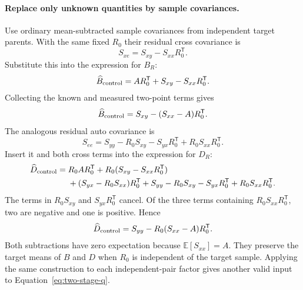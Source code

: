 \documentclass[11pt]{article}
\newcommand{\E}{\mathbb{E}}
\begin{document}
\paragraph{Replace only unknown quantities by sample covariances.}
Use ordinary mean-subtracted sample covariances from independent target
parents. With the same fixed $R_0$ their residual cross covariance is
\begin{equation}
 S_{xe}=S_{xy}-S_{xx}R_0^{\mathsf T}.
\end{equation}
Substitute this into the expression for $B_R$:
\begin{equation}
 \widehat B_{\rm control}
 =AR_0^{\mathsf T}+S_{xy}-S_{xx}R_0^{\mathsf T}.
\end{equation}
Collecting the known and measured two-point terms gives
\begin{equation}
 \widehat B_{\rm control}
 =S_{xy}-(S_{xx}-A)R_0^{\mathsf T}.
\end{equation}
The analogous residual auto covariance is
\begin{equation}
 S_{ee}=S_{yy}-R_0S_{xy}-S_{yx}R_0^{\mathsf T}
                 +R_0S_{xx}R_0^{\mathsf T}.
\end{equation}
Insert it and both cross terms into the expression for $D_R$:
\begin{align}
 \widehat D_{\rm control}={}&R_0AR_0^{\mathsf T}
 +R_0(S_{xy}-S_{xx}R_0^{\mathsf T})\nonumber\\
 &+(S_{yx}-R_0S_{xx})R_0^{\mathsf T}
 +S_{yy}-R_0S_{xy}-S_{yx}R_0^{\mathsf T}
 +R_0S_{xx}R_0^{\mathsf T}.
\end{align}
The terms in $R_0S_{xy}$ and $S_{yx}R_0^{\mathsf T}$ cancel. Of the three
terms containing $R_0S_{xx}R_0^{\mathsf T}$, two are negative and one is
positive. Hence
\begin{equation}
 \widehat D_{\rm control}
 =S_{yy}-R_0(S_{xx}-A)R_0^{\mathsf T}.
\end{equation}
Both subtractions have zero expectation because $\E[S_{xx}]=A$. They
preserve the target means of $B$ and $D$ when $R_0$ is independent of the
target sample. Applying the same construction to each independent-pair
factor gives another valid input to Equation~\eqref{eq:two-stage-q}.
\end{document}
